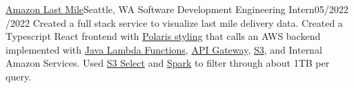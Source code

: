 \resumeSubheading
{\href{https://www.amazon.jobs/en/teams/last-mile}{Amazon Last Mile}}{Seattle, WA}
{Software Development Engineering Intern}{05/2022 /2022}
\resumeItemListStart
{}
{Created a full stack service to visualize last mile delivery data. Created a Typescript React frontend with \href{https://github.com/Shopify/polaris}{Polaris styling} that calls an AWS backend implemented with \href{https://docs.aws.amazon.com/lambda/latest/dg/lambda-java.html}{Java Lambda Functions}, \href{https://aws.amazon.com/api-gateway/}{API Gateway}, \href{https://aws.amazon.com/s3/}{S3}, and Internal Amazon Services. Used \href{https://docs.aws.amazon.com/AmazonS3/latest/userguide/selecting-content-from-objects.html}{S3 Select} and \href{https://spark.apache.org/}{Spark} to filter through about 1TB per query.}
\resumeItemListEnd
